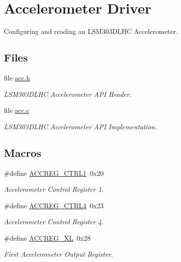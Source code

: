 \hypertarget{group__acc}{\section{Accelerometer Driver}
\label{group__acc}
}


Configuring and reading an L\-S\-M303\-D\-L\-H\-C Accelerometer.  


\subsection*{Files}
\begin{DoxyCompactItemize}
\item 
file \hyperlink{acc_8h}{acc.\-h}
\begin{DoxyCompactList}\small\item\em L\-S\-M303\-D\-L\-H\-C Accelerometer A\-P\-I Header. \end{DoxyCompactList}\item 
file \hyperlink{acc_8c}{acc.\-c}
\begin{DoxyCompactList}\small\item\em L\-S\-M303\-D\-L\-H\-C Accelerometer A\-P\-I Implementation. \end{DoxyCompactList}\end{DoxyCompactItemize}
\subsection*{Macros}
\begin{DoxyCompactItemize}
\item 
\#define \hyperlink{group__acc_gae81a43863d896c9afe65cc45bf8db9dc}{A\-C\-C\-R\-E\-G\-\_\-\-C\-T\-R\-L1}~0x20
\begin{DoxyCompactList}\small\item\em Accelerometer Control Register 1. \end{DoxyCompactList}\item 
\#define \hyperlink{group__acc_ga4369b46f297623a18b9d937623b7f783}{A\-C\-C\-R\-E\-G\-\_\-\-C\-T\-R\-L4}~0x23
\begin{DoxyCompactList}\small\item\em Accelerometer Control Register 4. \end{DoxyCompactList}\item 
\#define \hyperlink{group__acc_ga9d03f89f2f3ef006967f84157a21075b}{A\-C\-C\-R\-E\-G\-\_\-\-X\-L}~0x28
\begin{DoxyCompactList}\small\item\em First Accelerometer Output Register. \end{DoxyCompactList}\end{DoxyCompactItemize}

